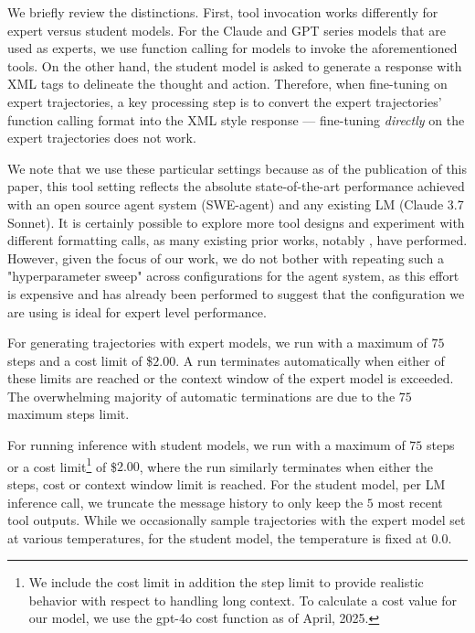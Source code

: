 

We briefly review the distinctions.
First, tool invocation works differently for expert versus student models.
For the Claude and GPT series models that are used as experts, we use function calling for models to invoke the aforementioned tools.
On the other hand, the student model is asked to generate a response with XML tags to delineate the thought and action.
Therefore, when fine-tuning on expert trajectories, a key processing step is to convert the expert trajectories' function calling format into the XML style response --- fine-tuning \textit{directly} on the expert trajectories does not work.

We note that we use these particular settings because as of the publication of this paper, this tool setting reflects the absolute state-of-the-art performance achieved with an open source agent system (SWE-agent) and any existing LM (Claude 3.7 Sonnet).
It is certainly possible to explore more tool designs and experiment with different formatting calls, as many existing prior works, notably \citet{yang_swe-agent_2024}, have performed.
However, given the focus of our work, we do not bother with repeating such a "hyperparameter sweep" across configurations for the agent system, as this effort is expensive and has already been performed to suggest that the configuration we are using is ideal for expert level performance.

For generating trajectories with expert models, we run with a maximum of $75$ steps and a cost limit of \$$2.00$.
A run terminates automatically when either of these limits are reached or the context window of the expert model is exceeded.
The overwhelming majority of automatic terminations are due to the $75$ maximum steps limit.

For running inference with student models, we run with a maximum of $75$ steps or a cost limit\footnote{We include the cost limit in addition the step limit to provide realistic behavior with respect to handling long context. To calculate a cost value for our model, we use the gpt-4o cost function as of April, 2025.} of \$$2.00$, where the run similarly terminates when either the steps, cost or context window limit is reached.
For the student model, per LM inference call, we truncate the message history to only keep the $5$ most recent tool outputs.
While we occasionally sample trajectories with the expert model set at various temperatures, for the student model, the temperature is fixed at $0.0$.

